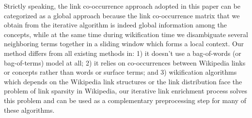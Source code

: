Strictly speaking, the link co-occurrence approach adopted in this paper
can be categorized as a global approach because the link co-occurrence
matrix that we obtain from the iterative algorithm is indeed global
information among the concepts, while at the same time during wikification
time we disambiguate several neighboring terms together in a sliding
window which forms a local context. Our method differs from all
existing methods in: 1) it doesn't use a bag-of-words
(or bag-of-terms) model at all; 2) it relies on co-occurrences between
Wikipedia links or concepts rather than words or surface terms; and
3) wikification algorithms which depends on the Wikipedia link structures
or the link distribution face the problem of link sparsity in Wikipedia,
our iterative link enrichment process solves this problem and
can be used as a complementary preprocessing step for many of these algorithms.


